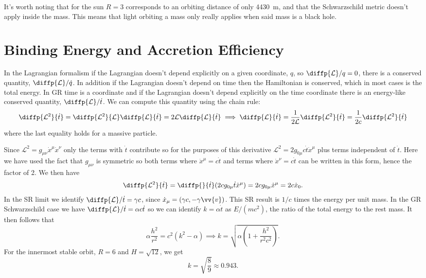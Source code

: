 \documentclass[fleqn]{NotesClass}
\newcommand*{\lagrangian}{\mathcal{L}}
\begin{document}
    It's worth noting that for the sun \(R = 3\) corresponds to an orbiting distance of only \qty{4430}{\metre}, and that the Schwarzschild metric doesn't apply inside the mass.
    This means that light orbiting a mass only really applies when said mass is a black hole.
    
    \section{Binding Energy and Accretion Efficiency}
    In the Lagrangian formalism if the Lagrangian doesn't depend explicitly on a given coordinate, \(q\), so \(\diffp{\lagrangian}/{q} = 0\), there is a conserved quantity, \(\diffp{\lagrangian}/{\dot{q}}\).
    In addition if the Lagrangian doesn't depend on time then the Hamiltonian is conserved, which in most cases is the total energy.
    In GR time is a coordinate and if the Lagrangian doesn't depend explicitly on the time coordinate there is an energy-like conserved quantity, \(\diffp{\lagrangian}/{\dot{t}}\).
    We can compute this quantity using the chain rule:
    \begin{equation}
        \diffp{\lagrangian^2}{\dot{t}} = \diffp{\lagrangian^2}{\lagrangian} \diffp{\lagrangian}{\dot{t}} = 2\lagrangian \diffp{\lagrangian}{\dot{t}} \implies \diffp{\lagrangian}{\dot{t}} = \frac{1}{2\lagrangian}\diffp{\lagrangian^2}{\dot{t}} = \frac{1}{2c}\diffp{\lagrangian^2}{\dot{t}}
    \end{equation}
    where the last equality holds for a massive particle.
    
    Since \(\lagrangian^2 = g_{\mu\nu}\dot{x}^\mu \dot{x}^\nu\) only the terms with \(\dot{t}\) contribute so for the purposes of this derivative \(\lagrangian^2 = 2g_{0\mu} c\dot{t}\dot{x}^\mu\) plus terms independent of \(\dot{t}\).
    Here we have used the fact that \(g_{\mu\nu}\) is symmetric so both terms where \(\dot{x}^\mu = c\dot{t}\) and terms where \(\dot{x}^\nu = c\dot{t}\) can be written in this form, hence the factor of 2.
    We then have
    \begin{equation}
        \diffp{\lagrangian^2}{\dot{t}} = \diffp{}{\dot{t}} (2c g_{0\mu} \dot{t} \dot{x}^\mu) = 2cg_{0\mu}\dot{x}^\mu = 2c\dot{x}_0.
    \end{equation}
    In the SR limit we identify \(\diffp{\lagrangian}/{\dot{t}} = \gamma c\), since \(\dot{x}_\mu = (\gamma c, -\gamma\vv{v})\).
    This SR result is \(1/c\) times the energy per unit mass.
    In the GR Schwarzschild case we have \(\diffp{\lagrangian}/{\dot{t}} = \alpha c\dot{t}\) so we can identify \(k = \alpha\dot{t}\) as \(E/(mc^2)\), the ratio of the total energy to the rest mass.
    It then follows that
    \begin{equation}
        \alpha \frac{h^2}{r^2} = c^2(k^2 - \alpha) \implies k = \sqrt{\alpha\left( 1 + \frac{h^2}{r^2c^2} \right)}.
    \end{equation}
    For the innermost stable orbit, \(R = 6\) and \(H = \sqrt{12}\), we get
    \begin{equation}
        k = \sqrt{\frac{8}{9}} \approx 0.943.
    \end{equation}
    
\end{document}
